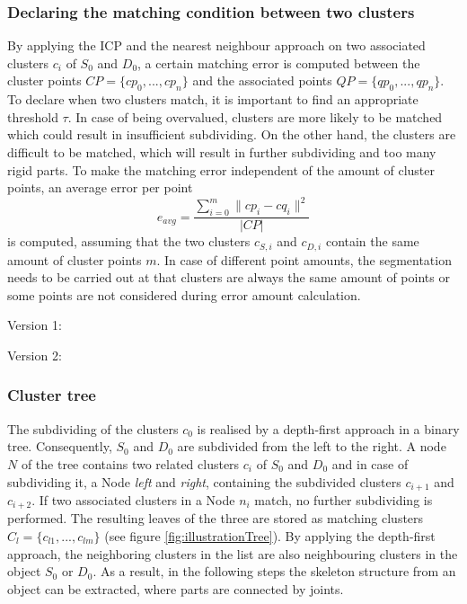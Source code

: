 \documentclass[a4paper,english,11pt]{report}
\begin{document}
\subsubsection{Declaring the matching condition between two clusters}

By applying the ICP and the nearest neighbour approach on two associated clusters $c_i$ of $S_0$ and $D_0$, a certain matching error is computed between the cluster points
$ CP =  \{ {cp_0, ..., cp_n}\}$ and the associated points $ QP =  \{ {qp_0, ..., qp_n}\}$. To declare when two clusters match, it is important to find an appropriate threshold $\tau$. In case of being overvalued, clusters are more likely to be matched which could result in insufficient subdividing. On the other hand, the clusters are difficult to be matched, which will result in further subdividing and too many rigid parts. To make the matching error independent of the amount of cluster points, an average error per point
%
\begin{equation}
e_{avg} = \frac{\displaystyle\sum_{i=0}^{m}\| cp_i - cq_i\|^2}{| CP |}
\end{equation}
%
is computed, assuming that the two clusters $c_{S, i}$ and $c_{D, i}$ contain the same amount of cluster points $m$. In case of different point amounts, the segmentation needs to be carried out at that clusters are always the same amount of points or some points are not considered during error amount calculation.

Version 1:



Version 2:

\subsubsection{Cluster tree}
\label{tree}

The subdividing of the clusters $c_0$ is realised by a depth-first approach in a binary tree. Consequently, $S_0$ and $D_0$ are subdivided from the left to the right. A node $N$ of the tree contains two related clusters $c_i$ of $S_0$ and $D_0$ and in case of subdividing it, a Node \textit{left} and \textit{right}, containing the subdivided clusters $c_{i+1}$ and $c_{i+2}$. If two associated clusters in a Node $n_i$ match, no further subdividing is performed. The resulting leaves of the three are stored as matching clusters $C_l = \{{c_{l1}, ... , c_{lm}}\}$ (see figure \ref{fig:illustrationTree}). By applying the depth-first approach, the neighboring clusters in the list are also neighbouring clusters in the object $S_0$ or $D_0$.  As a result, in the following steps the skeleton structure from an object can be extracted, where parts are connected by joints.
\end{document}

